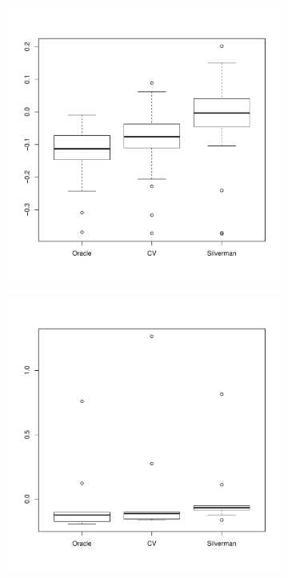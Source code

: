 \begin{figure}[htbp]
    \centering
    \begin{subfigure}[t]{0.45\textwidth}
        \includegraphics[width=\textwidth]{results/by_overall/relative-centroid-bias-boxplot}
        \label{fig:discussion:overall_centroidbias_boxplot:unif}
    \end{subfigure}
    \begin{subfigure}[t]{0.45\textwidth}
        \includegraphics[width=\textwidth]{results/by_overall/relative-centroid-bias-peakpop-boxplot}

\end{subfigure}
\end{figure}
